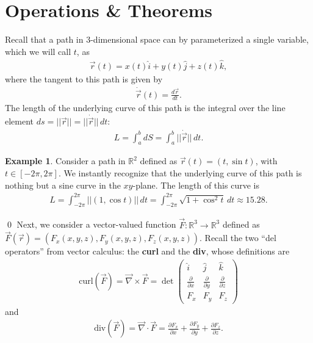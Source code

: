 \documentclass{book}
\theoremstyle{definition}
\newtheorem{exmp}{Example}[section]
\begin{document}
\section{Operations \& Theorems}
Recall that a path in 3-dimensional space can by parameterized a single variable, which we will call $t$, as
\begin{align*}
\vec{r}(t) = x(t)\hat{i} + y(t)\hat{j} + z(t)\hat{k},
\end{align*}
where the tangent to this path is given by
\begin{align*}
\dot{\vec{r}}(t) = \frac{d \vec{r}}{dt}.
\end{align*}
The length of the underlying curve of this path is the integral over the line element $ds = \vert\vert \vec{r} \vert\vert = \vert\vert \dot{\vec{r}} \vert\vert\,dt$:
\begin{align*}
L = \int_{a}^{b} dS = \int_{a}^{b} \vert\vert \dot{\vec{r}} \vert\vert\,dt.
\end{align*} 
\begin{exmp}
Consider a path in $\mathbb{R}^2$ defined as $\vec{r}(t) = (t, \sin t)$, with $t \in [-2\pi, 2\pi]$. We instantly recognize that the underlying curve of this path is nothing but a sine curve in the $xy$-plane. The length of this curve is
\begin{align*}
L = \int_{-2\pi}^{2\pi}\vert\vert  (1,\cos t)\vert\vert\,dt  = \int_{-2\pi}^{2\pi} \sqrt{1+\cos^2 t}\,dt \approx 15.28.
\end{align*}
\end{exmp}\qed
Next, we consider a vector-valued function $\vec{F} : \mathbb{R}^3 \rightarrow \mathbb{R}^3$ defined as $\vec{F}(\vec{r}) = (F_x(x,y,z), F_y(x,y,z),F_z(x,y,z))$. Recall the two ``del operators'' from vector calculus: the \textbf{curl} and the \textbf{div}, whose definitions are
\begin{align*}
\text{curl}(\vec{F}) = \vec{\nabla} \times \vec{F} = \det
\begin{pmatrix}
\hat{i} & \hat{j} & \hat{k} \\
\frac{\partial}{\partial x} & \frac{\partial }{\partial y} & \frac{\partial}{\partial z}\\
F_x & F_y & F_z
\end{pmatrix}
\end{align*}
and 
\begin{align*}
\text{div}(\vec{F}) = \vec{\nabla} \cdot \vec{F} = 
\frac{\partial F_x}{\partial x} + \frac{\partial F_y }{\partial y} + \frac{\partial F_z}{\partial z}.
\end{align*}
\end{document}

